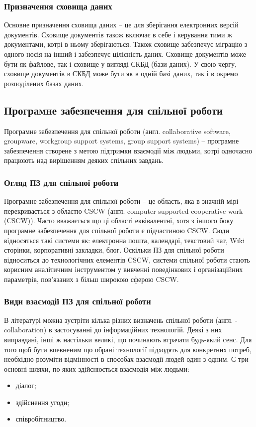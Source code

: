 \subsubsection{Призначення сховища даних}
Основне призначення сховища даних -- це для зберігання електронних версій документів. 
Сховище документів також включає в себе і керування тими ж документами, котрі в ньому зберігаються.
Також сховище забезпечує міграцію з одного носія на інший і забезпечує цілісність даних.
Сховище документів може бути як файлове, так і сховище у вигляді СКБД (бази даних). 
У свою чергу, сховище документів в СКБД може бути як в одній базі даних, так і в окремо розподілених базах даних.
        

\subsection{Програмне забезпечення для спільної роботи}
Програмне забезпечення для спільної роботи (англ. collaborative software, groupware, workgroup support systems, group support systems) -- програмне забезпечення створене з метою підтримки взаємодії між людьми, котрі одночасно працюють над вирішенням деяких спільних завдань. 

\subsubsection{Огляд ПЗ для спільної роботи}
Програмне забезпечення для спільної роботи -- це область, яка в значній мірі перекривається з областю CSCW (англ. computer-supported cooperative work (CSCW)).
Часто вважається що ці області еквівалентні, хотя з іншого боку програмне забезпечення для спільної роботи є підчастиною CSCW.
Сюди відносяться такі системи як: електронна пошта, календарі, текстовий чат, Wiki сторінки, корпоративні закладки, блог.
Оскільки ПЗ для спільної роботи відноситься до технологічних елементів CSCW, системи спільної роботи стають корисним аналітичним інструментом у вивченні поведінкових і організаційних параметрів, пов'язаних з більш широкою сферою CSCW.

\subsubsection{Види взаємодії ПЗ для спільної роботи}
В літературі можна зустріти кілька різних визначень спільної роботи (англ. - collaboration) в застосуванні до інформаційних технологій. Деякі з них виправдані, інші ж настільки великі, що починають втрачати будь-який сенс.
Для того щоб бути впевненим що обрані технології підходять для конкретних потреб, необхідно розуміти відмінності в способах взаємодії людей один з одним.
Є три основні шляхи, по яких здійснюється взаємодія між людьми: 
\begin{itemize}
\item діалог;
\item здійснення угоди;
\item співробітництво.
\end{itemize}

